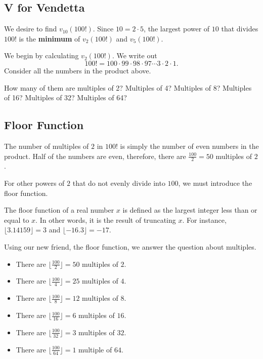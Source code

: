 \clearpage



\subsection{V for Vendetta}

We desire to find $v_{10}(100!)$.  Since $10=2\cdot 5$, the largest power of $10$ that divides $100!$ is the \textbf{minimum} of $v_2(100!)$ and $v_5(100!)$.   

We begin by calculating $v_2(100!)$. We write out $$100!=100\cdot 99\cdot 98\cdot 97\cdots 3\cdot 2\cdot 1.$$  Consider all the numbers in the product above. 

How many of them are multiples of 2?  Multiples of 4?  Multiples of 8?  Multiples of 16?  Multiples of 32?  Multiples of 64?  

\clearpage 

\subsection*{Floor Function}

The number of multiples of $2$ in $100!$ is simply the number of even numbers in the product. Half of the numbers are even, therefore, there are $\frac{100}{2}=50$ multiples of $2$.  

For other powers of $2$ that do not evenly divide into $100$, we must introduce the floor function.  

\begin{defi} The floor function of a real number $x$ is defined as the largest integer less than or equal to $x$. In other words, it is the result of truncating $x$. For instance, $\lfloor 3.14159 \rfloor=3$ and $\lfloor -16.3 \rfloor=-17$. \end{defi}

\clearpage

Using our new friend, the floor function, we answer the question about multiples.
\begin{itemize}  
	\item  There are $\lfloor \frac{100}{2} \rfloor=50$ multiples of $2$.
	\item  There are $\lfloor \frac{100}{4} \rfloor=25$ multiples of $4$.
	\item  There are $\lfloor \frac{100}{8} \rfloor=12$ multiples of $8$.
	\item  There are $\lfloor \frac{100}{16} \rfloor=6$ multiples of $16$.
	\item  There are $\lfloor \frac{100}{32} \rfloor=3$ multiples of $32$.
	\item  There are $\lfloor \frac{100}{64} \rfloor=1$ multiple of $64$.  
\end{itemize}

